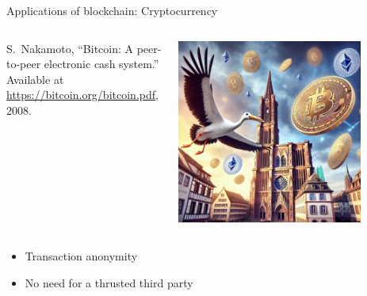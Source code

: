 \documentclass{beamer}
\begin{document}
\begin{frame}{Applications of blockchain: Cryptocurrency}
\begin{columns}
\begin{column}{0.5\textwidth}
   
{\footnotesize
\begin{thebibliography}{1}
S.~Nakamoto, ``Bitcoin: A peer-to-peer electronic cash system.'' Available at
  \href{https://bitcoin.org/bitcoin.pdf}{https://bitcoin.org/bitcoin.pdf},
  2008.
\end{thebibliography}  
}
\end{column}
\begin{column}{0.5\textwidth}  %
    \begin{center}
     \includegraphics[width=0.8\textwidth]{../../Figures/bitcoin-eth-strasbourg.png}
     \end{center}
\end{column}
\end{columns}
\begin{itemize}
  \item Transaction anonymity
  \item No need for a thrusted third party
\end{itemize}


\end{frame}
\end{document}
